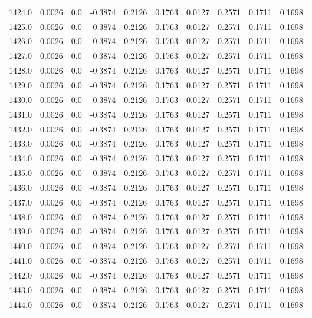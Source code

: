 \begin{longtable}{lrrrrrrrrr}
1424.0 & 0.0026 & 0.0 & -0.3874 & 0.2126 & 0.1763 & 0.0127 & 0.2571 & 0.1711 & 0.1698 \\
1425.0 & 0.0026 & 0.0 & -0.3874 & 0.2126 & 0.1763 & 0.0127 & 0.2571 & 0.1711 & 0.1698 \\
1426.0 & 0.0026 & 0.0 & -0.3874 & 0.2126 & 0.1763 & 0.0127 & 0.2571 & 0.1711 & 0.1698 \\
1427.0 & 0.0026 & 0.0 & -0.3874 & 0.2126 & 0.1763 & 0.0127 & 0.2571 & 0.1711 & 0.1698 \\
1428.0 & 0.0026 & 0.0 & -0.3874 & 0.2126 & 0.1763 & 0.0127 & 0.2571 & 0.1711 & 0.1698 \\
1429.0 & 0.0026 & 0.0 & -0.3874 & 0.2126 & 0.1763 & 0.0127 & 0.2571 & 0.1711 & 0.1698 \\
1430.0 & 0.0026 & 0.0 & -0.3874 & 0.2126 & 0.1763 & 0.0127 & 0.2571 & 0.1711 & 0.1698 \\
1431.0 & 0.0026 & 0.0 & -0.3874 & 0.2126 & 0.1763 & 0.0127 & 0.2571 & 0.1711 & 0.1698 \\
1432.0 & 0.0026 & 0.0 & -0.3874 & 0.2126 & 0.1763 & 0.0127 & 0.2571 & 0.1711 & 0.1698 \\
1433.0 & 0.0026 & 0.0 & -0.3874 & 0.2126 & 0.1763 & 0.0127 & 0.2571 & 0.1711 & 0.1698 \\
1434.0 & 0.0026 & 0.0 & -0.3874 & 0.2126 & 0.1763 & 0.0127 & 0.2571 & 0.1711 & 0.1698 \\
1435.0 & 0.0026 & 0.0 & -0.3874 & 0.2126 & 0.1763 & 0.0127 & 0.2571 & 0.1711 & 0.1698 \\
1436.0 & 0.0026 & 0.0 & -0.3874 & 0.2126 & 0.1763 & 0.0127 & 0.2571 & 0.1711 & 0.1698 \\
1437.0 & 0.0026 & 0.0 & -0.3874 & 0.2126 & 0.1763 & 0.0127 & 0.2571 & 0.1711 & 0.1698 \\
1438.0 & 0.0026 & 0.0 & -0.3874 & 0.2126 & 0.1763 & 0.0127 & 0.2571 & 0.1711 & 0.1698 \\
1439.0 & 0.0026 & 0.0 & -0.3874 & 0.2126 & 0.1763 & 0.0127 & 0.2571 & 0.1711 & 0.1698 \\
1440.0 & 0.0026 & 0.0 & -0.3874 & 0.2126 & 0.1763 & 0.0127 & 0.2571 & 0.1711 & 0.1698 \\
1441.0 & 0.0026 & 0.0 & -0.3874 & 0.2126 & 0.1763 & 0.0127 & 0.2571 & 0.1711 & 0.1698 \\
1442.0 & 0.0026 & 0.0 & -0.3874 & 0.2126 & 0.1763 & 0.0127 & 0.2571 & 0.1711 & 0.1698 \\
1443.0 & 0.0026 & 0.0 & -0.3874 & 0.2126 & 0.1763 & 0.0127 & 0.2571 & 0.1711 & 0.1698 \\
1444.0 & 0.0026 & 0.0 & -0.3874 & 0.2126 & 0.1763 & 0.0127 & 0.2571 & 0.1711 & 0.1698 \\

\end{longtable}
